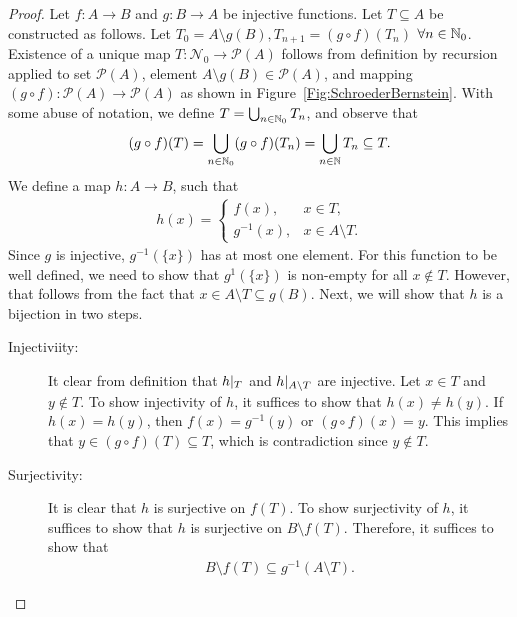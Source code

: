 \documentclass[a4paper,english,12pt]{article}   	%
\begin{document}
\begin{proof} Let $f \colon A \to B$ and $g \colon B \to A$ be injective functions. Let $T \subseteq A$ be constructed as follows. Let $T_{0}=A \setminus g(B), T_{n+1}= (g \circ f)(T_{n})$ $\forall n \in \mathbb{N}_{0}$. Existence of a unique map $T: \mathcal{N}_0 \to \mathcal{P}(A)$ follows from definition by recursion applied to set $\mathcal{P}(A)$, element $A \setminus g(B) \in \mathcal{P}(A)$, and mapping $(g \circ f): \mathcal{P}(A) \to \mathcal{P}(A)$ as shown in Figure~\ref{Fig:SchroederBernstein}. With some abuse of notation, we define $T = \bigcup_{n \in \mathbb{N}_{0}} T_{n}$, and observe that
\begin{align*}
(g \circ f)(T)=\bigcup_{n \in \mathbb{N}_{0}} (g \circ f)(T_{n}) = \bigcup _{n \in \mathbb{N}} T_{n} \subseteq T.
\end{align*}
We define a map $h \colon A \to B$, such that 
\begin{align*}
h(x) = \begin{cases}f(x), &x \in T, \\ g^{-1}(x), & x \in A \setminus T.\end{cases}
\end{align*}
Since $g$ is injective, $g^{-1}(\{x\})$ has at most one element. For this function to be well defined, we need to show that $g^{1}(\{x\})$ is non-empty for all $x \notin T$. However, that follows from the fact that $x \in A\setminus T \subseteq g(B)$. Next, we will show that $h$ is a bijection in two steps.
\begin{description}
\item[Injectiviity:] It clear from definition that $h \arrowvert_{T}$ and $h \arrowvert_{A \setminus T}$ are injective. Let $x \in T$ and $y \notin T$. To show injectivity of $h$, it suffices to show that $h(x) \neq h(y)$. If $h(x)=h(y)$, then $f(x) = g^{-1}(y)$ or $(g \circ f)(x) = y$. This implies that $y \in (g \circ f)(T) \subseteq T$, which is contradiction since  $y \notin T$. %
\item[Surjectivity:] It is clear that $h$ is surjective on $f(T)$. To show surjectivity of $h$, it suffices to show that $h$ is surjective on $B \setminus f(T)$. Therefore, it suffices to show that 
\begin{align*}
B \setminus f(T) \subseteq g^{-1}(A \setminus T).

\end{align*}
\end{description}
\end{proof}
\end{document}
